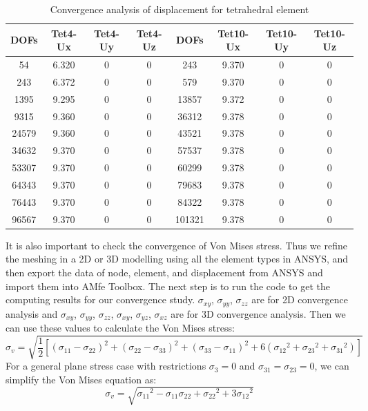 \begin{table}[ht]
	\caption{Convergence analysis of displacement for tetrahedral element} \label{tab: TetConvergence}
	\begin{tabular}{ c | c | c | c | c | c | c | c} 	
		DOFs & Tet4-Ux & Tet4-Uy & Tet4-Uz & DOFs & Tet10-Ux & Tet10-Uy & Tet10-Uz\\ \hline
		54 & 6.320 & 0 & 0 & 243 & 9.370& 0  & 0 \\ 
		243 & 6.372 & 0 & 0 & 579 & 9.370&0 & 0\\
		1395 & 9.295 & 0 & 0 & 13857 & 9.372&  0 & 0 \\
		9315 & 9.360 &  0 &  0 & 36312&9.378 &0 & 0\\
		24579 & 9.360 &  0 &  0 & 43521 & 9.378&0 & 0\\
		34632 & 9.370 &  0 & 0 &  57537 & 9.378&0 & 0  \\
		53307 & 9.370 &   0 & 0 &  60299 & 9.378&0 & 0 \\
		64343 & 9.370 & 0 &  0 & 79683 & 9.378&0 & 0\\
		76443 & 9.370 & 0 & 0 & 84322 & 9.378 &0 & 0 \\
		96567 & 9.370 & 0 & 0 &  101321 & 9.378& 0& 0\\
		\hline  
	\end{tabular}
\end{table}
It is also important to check the convergence of Von Mises stress. Thus we refine the meshing in a 2D or 3D modelling using all the element types in ANSYS, and then export the data of node, element, and displacement from ANSYS and import them into AMfe Toolbox. The next step is to run the code to get the computing results for our convergence study. $\sigma_{xy}$, $\sigma_{yy}$, $\sigma_{zz}$ are for 2D convergence analysis and $\sigma_{xy}$, $\sigma_{yy}$, $\sigma_{zz}$, $\sigma_{xy}$, $\sigma_{yz}$, $\sigma_{xz}$ are for 3D convergence analysis.   Then we can use these values to calculate the Von Mises stress: 
\begin{equation}
\sigma_v = \sqrt{\frac{1}{2}\left[\left(\sigma_{11}-\sigma_{22}\right)^2 + \left(\sigma_{22}-\sigma_{33}\right)^2 + \left(\sigma_{33}-\sigma_{11}\right)^2 + 6\left({\sigma_{12}}^2 + {\sigma_{23}}^2 + {\sigma_{31}}^2 \right) \right]}
\end{equation}
For a general plane stress case with restrictions $\sigma_3 = 0$ and $\sigma_{31} = \sigma_{23} = 0$, we can simplify the Von Mises equation as:
\begin{equation}
\sigma_v = \sqrt{{\sigma_{11}}^2 - \sigma_{11}\sigma_{22} + {\sigma_{22}}^2 + 3 {\sigma_{12}}^2}
\end{equation}
